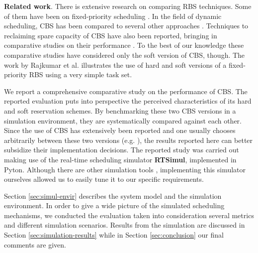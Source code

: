\documentclass[times, 10pt,twocolumn]{article}
\newcommand{\simul}{\textbf{RTSimul}} %
\begin{document}
\textbf{Related work}. There is extensive research on comparing RBS
techniques.  Some of them have been on fixed-priority scheduling
\cite{bernat.ea99:new,bernat.ea02:multiple,davis.ea05:hierarchical,davis.ea95:dual}.
In the field of dynamic scheduling, CBS has been compared to several
other approaches \cite{spuri.ea96:scheduling}.  Techniques to
reclaiming spare capacity of CBS have also been reported, bringing in
comparative studies on their performance
\cite{caccamo.ea00:capacity,lin.ea05:improving}. To the best of our
knowledge these comparative studies have considered only the soft
version of CBS, though.  The work by Rajkumar et
al. \cite{rajkumar.ea01:resource} illustrates the use of hard and soft
versions of a fixed-priority RBS using a very simple task set.

\label{sec:contr-this-paper}

We report a comprehensive comparative study on the performance of
CBS. The reported evaluation puts into perspective the perceived
characteristics of its hard and soft reservation schemes.  By
benchmarking these two CBS versions in a simulation environment, they
are systematically compared against each other.  Since the use of CBS
has extensively been reported and one usually chooses arbitrarily
between these two versions
(e.g. \cite{abeni.ea99:adaptive,abeni.ea05:qos}), the results reported
here can better subsidize their implementation decisions.  The
reported study was carried out making use of the real-time scheduling
simulator \simul{}, implemented in Pyton. Although there are other
simulation tools \cite{ancilotti.ea96:flexible}, implementing this
simulator ourselves allowed us to easily tune it to our specific
requirements.

\label{sec:structure-this-paper}

Section \ref{sec:simul-envir} describes the system model and the
simulation environment.  In order to give a wide picture of the
simulated scheduling mechanisms, we conducted the evaluation taken
into consideration several metrics and different simulation
scenarios. Results from the simulation are discussed in Section
\ref{sec:simulation-results} while in Section \ref{sec:conclusion} our
final comments are given.

\label{sec:simul-envir}
\end{document}
